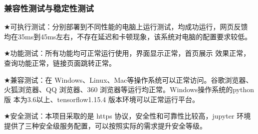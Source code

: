 \documentclass[withoutpreface,bwprint]{cumcmthesis} %
\begin{document}
	\subsubsection{ 兼容性测试与稳定性测试}
	$\bigstar$可执行测试：分别部署到不同性能的电脑上运行测试，均成功运行，网页反馈
	均在35ms到45ms左右，不存在延迟和卡顿现象，该系统对电脑的配置要求较低。\par
	$\bigstar$功能测试：所有功能均可正常运行使用，界面显示正常，首页展示
	效果正常，查询功能正常，链接页面跳转正常。\par
	$\bigstar$兼容测试：在 Windows、Linux、Mac等操作系统可以正常访问。谷歌浏览器、
	火狐浏览器、QQ 浏览器、360 浏览器等运行均正常。Windows操作系统的python版
	本为3.6以上、tensorflow1.15.4 版本环境可以正常运行平台。\par
	$\bigstar$安全测试：本项目采取的是 https 协议，安全性和可靠性比较高，jupyter 环境
	提供了三种安全级服务配置，可以按照实际的需求提升安全等级。\par
	\newpage
\end{document}
